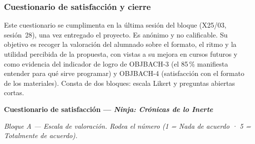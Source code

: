 \documentclass[a4paper,12pt]{article}
\begin{document}
\subsubsection{Cuestionario de satisfacción y cierre}

Este cuestionario se cumplimenta en la última sesión del bloque (X25/03, sesión~28), una vez entregado el proyecto. Es anónimo y no calificable. Su objetivo es recoger la valoración del alumnado sobre el formato, el ritmo y la utilidad percibida de la propuesta, con vistas a su mejora en cursos futuros y como evidencia del indicador de logro de OBJBACH-3 (el 85\,\% manifiesta entender para qué sirve programar) y OBJBACH-4 (satisfacción con el formato de los materiales). Consta de dos bloques: escala Likert y preguntas abiertas cortas.

\vspace{0.3cm}
\noindent\textbf{Cuestionario de satisfacción — \textit{Ninja: Crónicas de lo Inerte}}

\vspace{0.15cm}
\noindent\small\textit{Bloque A — Escala de valoración. Rodea el número (1 = Nada de acuerdo · 5 = Totalmente de acuerdo).}
\normalsize
\end{document}
